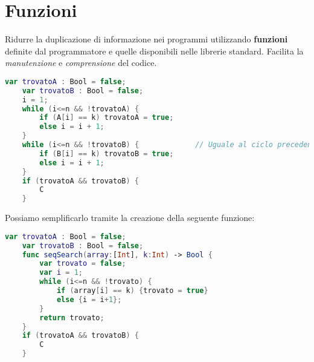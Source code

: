 \section{Funzioni}
\begin{definition}
	Ridurre la duplicazione di informazione nei programmi utilizzando \textbf{funzioni} definite dal programmatore e quelle disponibili nelle librerie standard. Facilita la \emph{manutenzione} e \emph{comprensione} del codice.
\end{definition}
\begin{lstlisting}[language=Swift, caption=Esempio di codice astraibile, mathescape=true]
	var trovatoA : Bool = false;
	var trovatoB : Bool = false;
	i = 1;
	while (i<=n && !trovatoA) {
		if (A[i] == k) trovatoA = true;
		else i = i + 1;
	}
	while (i<=n && !trovatoB) {				// Uguale al ciclo precedente se non per l'array
		if (B[i] == k) trovatoB = true;
		else i = i + 1;
	}
	if (trovatoA && trovatoB) {
		C
	}
\end{lstlisting}
Possiamo semplificarlo tramite la creazione della seguente funzione:
\begin{lstlisting}[language=Swift, caption=Esempio di funzione, mathescape=true]
	var trovatoA : Bool = false;
	var trovatoB : Bool = false;
	func seqSearch(array:[Int], k:Int) -> Bool {
		var trovato = false;
		var i = 1;
		while (i<=n && !trovato) {
			if (array[i] == k) {trovato = true}
			else {i = i+1};
		}
		return trovato;
	}
	if (trovatoA && trovatoB) {
		C
	}
\end{lstlisting}
